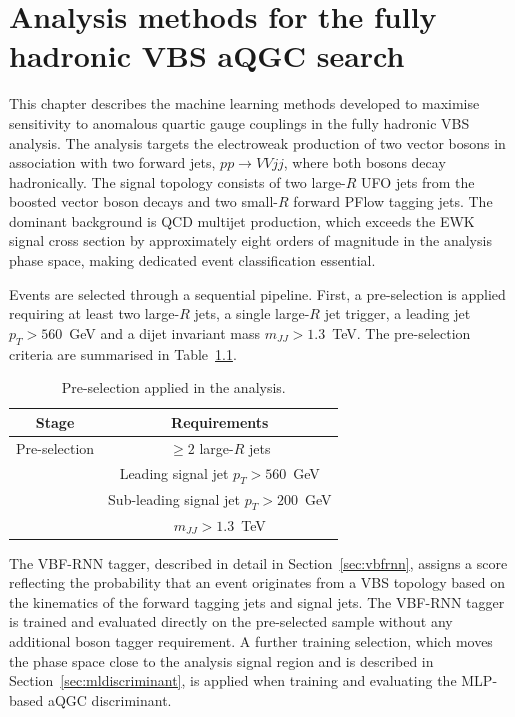 \chapter{Analysis methods for the fully hadronic VBS aQGC search}
\label{chap:analysismethods}

This chapter describes the machine learning methods developed to maximise sensitivity to anomalous quartic gauge couplings in the fully hadronic VBS analysis. The analysis targets the electroweak production of two vector bosons in association with two forward jets, $pp \to VVjj$, where both bosons decay hadronically. The signal topology consists of two large-$R$ UFO jets from the boosted vector boson decays and two small-$R$ forward PFlow tagging jets. The dominant background is QCD multijet production, which exceeds the EWK signal cross section by approximately eight orders of magnitude in the analysis phase space, making dedicated event classification essential.

Events are selected through a sequential pipeline. First, a pre-selection is applied requiring at least two large-$R$ jets, a single large-$R$ jet trigger, a leading jet $p_T > 560$~GeV and a dijet invariant mass $m_{JJ} > 1.3$~TeV. The pre-selection criteria are summarised in Table~\ref{tab:analysis_selection}.

\begin{table}[htbp]
  \centering
  \caption{Pre-selection applied in the analysis.}
  \label{tab:analysis_selection}
  \begin{tabular}{|c|c|}
    \hline
    \textbf{Stage} & \textbf{Requirements} \\
    \hline
    Pre-selection & $\geq 2$ large-$R$ jets \\
                  & Leading signal jet $p_T > 560$~GeV \\
                  & Sub-leading signal jet $p_T > 200$~GeV \\
                  & $m_{JJ} > 1.3$~TeV \\
    \hline
  \end{tabular}
\end{table}

The VBF-RNN tagger, described in detail in Section~\ref{sec:vbfrnn}, assigns a score reflecting the probability that an event originates from a VBS topology based on the kinematics of the forward tagging jets and signal jets. The VBF-RNN tagger is trained and evaluated directly on the pre-selected sample without any additional boson tagger requirement. A further training selection, which moves the phase space close to the analysis signal region and is described in Section~\ref{sec:mldiscriminant}, is applied when training and evaluating the MLP-based aQGC discriminant.

